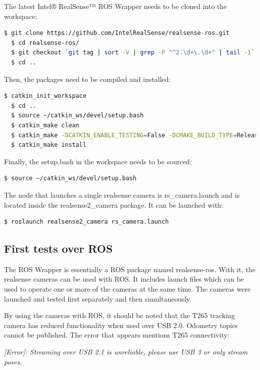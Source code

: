 \documentclass{article}
\begin{document}
The latest Intel® RealSense™ ROS Wrapper needs to be cloned into the workspace:

\begin{lstlisting}[language=bash]
  $ git clone https://github.com/IntelRealSense/realsense-ros.git
  $ cd realsense-ros/
  $ git checkout `git tag | sort -V | grep -P "^2.\d+\.\d+" | tail -1`
  $ cd ..
\end{lstlisting}

Then, the packages need to be compiled and installed:

\begin{lstlisting}[language=bash]
  $ catkin_init_workspace
  $ cd ..
  $ source ~/catkin_ws/devel/setup.bash
  $ catkin_make clean
  $ catkin_make -DCATKIN_ENABLE_TESTING=False -DCMAKE_BUILD_TYPE=Release
  $ catkin_make install
\end{lstlisting}

Finally, the setup.bash in the workspace needs to be sourced:

\begin{lstlisting}[language=bash]
  $ source ~/catkin_ws/devel/setup.bash
\end{lstlisting}

The node that launches a single realsense camera is rs\_camera.launch and is located inside the realsense2\_camera package. It can be launched with: 

\begin{lstlisting}[language=bash]
  $ roslaunch realsense2_camera rs_camera.launch
\end{lstlisting}


\subsection{First tests over ROS}

The ROS Wrapper is essentially a ROS package named realsense-ros. With it, the realsense cameras can be used with ROS. It includes launch files which can be used to operate one or more of the cameras at the same time. The cameras were launched and tested first separately and then simultaneously.

By using the cameras with ROS, it should be noted that the T265 tracking camera has reduced functionality when used over USB 2.0. Odometry topics cannot be published. The error that appears mentions T265 connectivity:

\textit{[Error]: Streaming over USB 2.1 is unreliable, please use USB 3 or only stream poses.}
\end{document}
